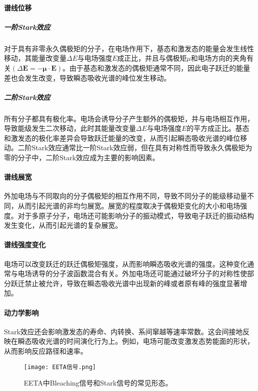 \paragraph{谱线位移}
\subparagraph{一阶Stark效应}
对于具有非零永久偶极矩的分子，在电场作用下，基态和激发态的能量会发生线性移动，其能量改变量$\Delta E$与电场强度$E$成正比，并且与偶极矩$\mu$和电场方向的夹角有关$(\Delta \symbf{E}=-\symbf{μ}\cdot\symbf{E})$。由于基态和激发态的偶极矩通常不同，因此电子跃迁的能量差也会发生改变，导致瞬态吸收光谱的峰位发生移动。
\subparagraph{二阶Stark效应}
所有分子都具有极化率。电场会诱导分子产生额外的偶极矩，并与电场相互作用，导致能级发生二次移动，此时其能量改变量$\Delta E$与电场强度$E$的平方成正比。基态和激发态的极化率差异会导致跃迁能量的改变，从而引起瞬态吸收光谱的峰位移动。二阶Stark效应通常比一阶Stark效应弱，但在具有对称性而导致永久偶极矩为零的分子中，二阶Stark效应成为主要的影响因素。
\paragraph{谱线展宽}
外加电场与不同取向的分子偶极矩的相互作用不同，导致不同分子的能级移动量不同，从而引起光谱的非均匀展宽。展宽的程度取决于偶极矩变化的大小和电场强度。对于多原子分子，电场还可能影响分子的振动模式，导致电子跃迁的振动结构发生变化，从而引起光谱的复杂展宽。
\paragraph{谱线强度变化}
电场可以改变跃迁的跃迁偶极矩强度，从而影响瞬态吸收光谱的强度。这种变化通常与电场诱导的分子波函数混合有关。外加电场还可能通过破坏分子的对称性使部分跃迁禁止被允许，导致在瞬态吸收光谱中出现新的峰或者原有峰的强度显著增加。
\paragraph{动力学影响}
Stark效应还会影响激发态的寿命、内转换、系间窜越等速率常数。这会间接地反映在瞬态吸收光谱的时间演化行为上。例如，电场可能改变激发态势能面的形状，从而影响反应路径和速率。
\begin{figure}[ht]
	\centering
	\texttt{[image: EETA信号.png]}
	\caption{EETA中Bleaching信号和Stark信号的常见形态。}
	\label{fig:xh}
\end{figure}

